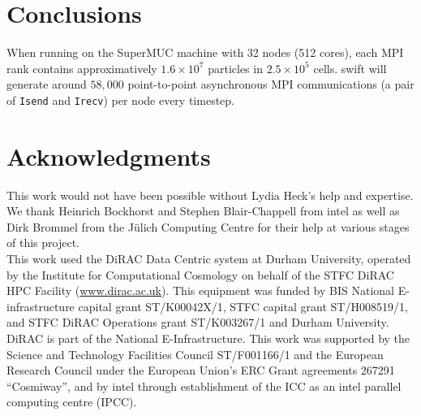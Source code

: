 \documentclass{sig-alternate-05-2015}
\newcommand{\swift}{{\sc swift}\xspace}
\begin{document}

\section{Conclusions}

When running on the SuperMUC machine with 32 nodes (512 cores), each MPI rank
contains approximatively $1.6\times10^7$ particles in $2.5\times10^5$
cells. \swift will generate around $58,000$ point-to-point asynchronous MPI
communications (a pair of \texttt{Isend} and \texttt{Irecv}) per node every
timestep. 



\section{Acknowledgments}
This work would not have been possible without Lydia Heck's help and
expertise. We thank Heinrich Bockhorst and Stephen Blair-Chappell from
{\sc intel} as well as Dirk Brommel from the J\"ulich Computing Centre
for their help at various stages of this project.\\
This work used the DiRAC Data Centric system at Durham University,
operated by the Institute for Computational Cosmology on behalf of the
STFC DiRAC HPC Facility (\url{www.dirac.ac.uk}). This equipment was
funded by BIS National E-infrastructure capital grant ST/K00042X/1,
STFC capital grant ST/H008519/1, and STFC DiRAC Operations grant
ST/K003267/1 and Durham University. DiRAC is part of the National
E-Infrastructure. This work was supported by the Science and
Technology Facilities Council ST/F001166/1 and the European Research
Council under the European Union's ERC Grant agreements 267291
``Cosmiway'', and by {\sc intel} through establishment of the ICC as
an {\sc intel} parallel computing centre (IPCC).

\nocite{*}


\end{document}
